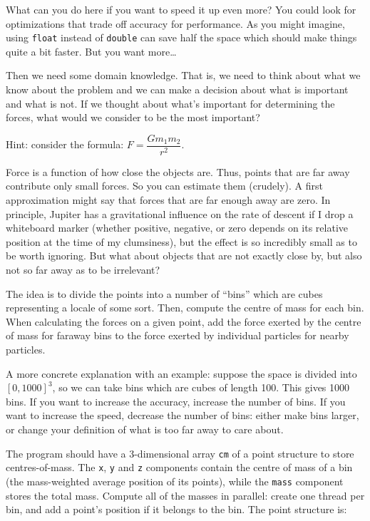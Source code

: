 What can you do here if you want to speed it up even more? You could look for optimizations that trade off accuracy for performance. As you might imagine, using \texttt{float} instead of \texttt{double} can save half the space which should make things quite a bit faster. But you want more\ldots

Then we need some domain knowledge. That is, we need to think about what we know about the problem and we can make a decision about what is important and what is not. If we thought about what's important for determining the forces, what would we consider to be the most important? 

Hint: consider the formula: $F = \dfrac{Gm_{1}m_{2}}{r^{2}}$. 

Force is a function of how close the objects are. Thus, points that are far away contribute only small forces. So you can estimate them (crudely). A first approximation might say that forces that are far enough away are zero. In principle, Jupiter has a gravitational influence on the rate of descent if I drop a whiteboard marker (whether positive, negative, or zero depends on its relative position at the time of my clumsiness), but the effect is so incredibly small as to be worth ignoring. But what about objects that are not exactly close by, but also not so far away as to be irrelevant?

The idea is to divide the points into a number of ``bins'' which are cubes representing a locale of some sort. Then, compute the centre of mass for each bin. When calculating the forces on a given point, add the force exerted by the centre of mass for faraway bins to the force exerted by individual particles for nearby particles.

A more concrete explanation with an example: suppose the space is divided into $[0, 1000]^3$, so we can take bins which are cubes of length 100. This gives 1000 bins. If you want to increase the accuracy, increase the number of bins. If you want to increase the speed, decrease the number of bins: either make bins larger, or change your definition of what is too far away to care about.

The program should have a 3-dimensional array {\tt cm} of a point structure to store centres-of-mass. The {\tt x}, {\tt y} and {\tt z}
components contain the centre of mass of a bin (the mass-weighted
average position of its points), while the {\tt mass} component stores the total mass. Compute all of
the masses in parallel: create one thread per bin, and add a point's
position if it belongs to the bin. The point structure is:

